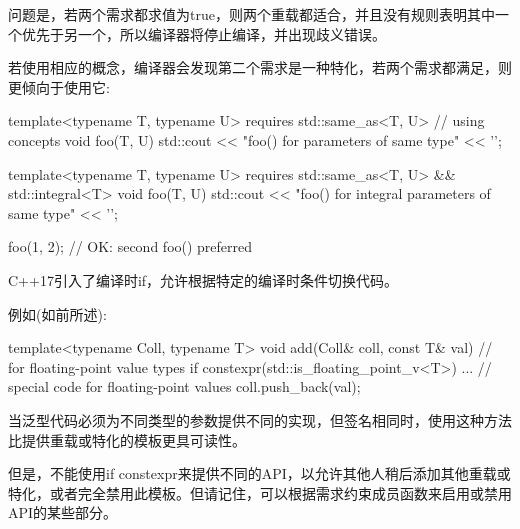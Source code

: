 问题是，若两个需求都求值为true，则两个重载都适合，并且没有规则表明其中一个优先于另一个，所以编译器将停止编译，并出现歧义错误。

若使用相应的概念，编译器会发现第二个需求是一种特化，若两个需求都满足，则更倾向于使用它:

\begin{cpp}
template<typename T, typename U>
requires std::same_as<T, U> // using concepts
void foo(T, U)
{
	std::cout << "foo() for parameters of same type" << '\n';
}

template<typename T, typename U>
requires std::same_as<T, U> && std::integral<T>
void foo(T, U)
{
	std::cout << "foo() for integral parameters of same type" << '\n';
}

foo(1, 2); // OK: second foo() preferred
\end{cpp}


C++17引入了编译时if，允许根据特定的编译时条件切换代码。

例如(如前所述):

\begin{cpp}
template<typename Coll, typename T>
void add(Coll& coll, const T& val) // for floating-point value types
{
	if constexpr(std::is_floating_point_v<T>) {
		... // special code for floating-point values
	}
	coll.push_back(val);
}
\end{cpp}

当泛型代码必须为不同类型的参数提供不同的实现，但签名相同时，使用这种方法比提供重载或特化的模板更具可读性。

但是，不能使用if constexpr来提供不同的API，以允许其他人稍后添加其他重载或特化，或者完全禁用此模板。但请记住，可以根据需求约束成员函数来启用或禁用API的某些部分。








